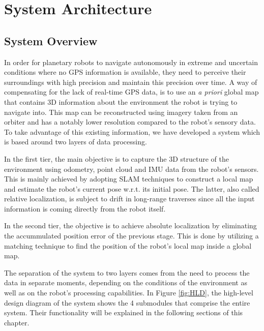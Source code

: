 \label{Chapter2}

\chapter{System Architecture}

\section{System Overview}

In order for planetary robots to navigate autonomously in extreme and
uncertain conditions where no GPS information is available,
they need to perceive their surroundings with high precision and
maintain this precision over time.
A way of compensating for the lack of real-time GPS data, is to use
an \textit{a priori} global map that contains 3D information about the
environment the robot is trying to navigate into.
This map can be reconstructed using imagery taken from an orbiter and
has a notably lower resolution compared to the robot's sensory data.
To take advantage of this existing information, we have developed a system
which is based around two layers of data processing.

In the first tier, the main objective is to capture the 3D structure of
the environment using odometry, point cloud and IMU data from the
robot's sensors.
This is mainly achieved by adopting SLAM techniques to construct
a local map and estimate the robot's current pose w.r.t. its initial pose.
The latter, also called relative localization, is subject to drift
in long-range traverses since all the input information is coming
directly from the robot itself.

In the second tier, the objective is to achieve absolute localization by
eliminating the accummulated position error of the previous stage.
This is done by utilizing a matching technique to find the position of the
robot's local map inside a global map.

The separation of the system to two layers comes from the need to process the
data in separate moments, depending on the conditions of the environment as
well as on the robot's processing capabilities.
In Figure \ref{fig:HLD}, the high-level design diagram of the system shows
the 4 submodules that comprise the entire system.
Their functionality will be explained in the following sections of this
chapter.

